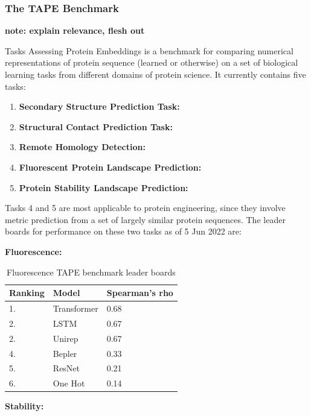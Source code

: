 \documentclass{article}
\begin{document}
\subsubsection{The TAPE Benchmark}

\textbf{note: explain relevance, flesh out}

Tasks Assessing Protein Embeddings \cite{tape2019} is a benchmark for comparing numerical representations of protein sequence (learned or otherwise) on a set of biological learning tasks from different domains of protein science. 
It currently contains five tasks:

\begin{enumerate}
\item \textbf{Secondary Structure Prediction Task:}
\item \textbf{Structural Contact Prediction Task:}
\item \textbf{Remote Homology Detection:}
\item \textbf{Fluorescent Protein Landscape Prediction:}
\item \textbf{Protein Stability Landscape Prediction:}
\end{enumerate}

Tasks 4 and 5 are most applicable to protein engineering, since they involve metric prediction from a set of largely similar protein sequences.
The leader boards for performance on these two tasks as of 5 Jun 2022 are:

\textbf{Fluorescence:}

\begin{table}
	\begin{center}
		\caption{Fluorescence TAPE benchmark leader boards \label{tapefluor}}
		\begin{tabular}{l|p{3cm}|l}
			\textbf{Ranking} & \textbf{Model} & \textbf{Spearman's rho}\\
		\hline 
			 1. & Transformer & 0.68 \\
			 2. & LSTM & 0.67 \\
			 2. & Unirep & 0.67 \\
			 4. & Bepler & 0.33 \\
			 5. & ResNet & 0.21 \\
			 6. & One Hot & 0.14 \\
		\end{tabular}
	\end{center}
\end{table}


\textbf{Stability:}
\end{document}
